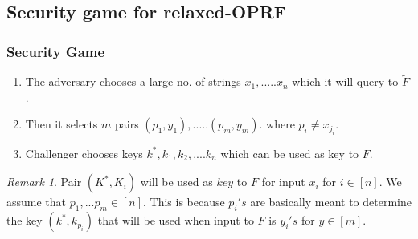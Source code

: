 \documentclass[hyperref={pdfpagelabels=false}]{beamer}
\theoremstyle{remark}
\newtheorem*{remark}{Remark}
\begin{document}
\subsection{Security game for relaxed-OPRF}
\begin{frame}
\frametitle{Security Game}
\begin{enumerate}
\item The adversary chooses a large no. of strings $x_1,.....x_n$ which it will query to $\widetilde{F}$.\pause
\item Then it selects $m$ pairs $(p_1,y_1),.....(p_m,y_m)$. where $p_i \neq x_{j_i}$.\pause
\item Challenger chooses keys $k^*, k_1, k_2, ....k_n$ which can be used as key to $F$.\pause

\end{enumerate}

\begin{remark}
Pair $(K^*,K_i)$ will be used as $key$ to $F$ for input $x_i$ for $i \in \left[n\right] $.
We assume that $p_1,...p_m \in \left[n\right]$. This is because $p_i's$ are basically meant to determine the key $(k^*,k_{p_i})$ that will be used when  input to $F$ is $y_i's$ for $y \in \left[m\right]$.
\end{remark}

\end{frame}
\end{document}

